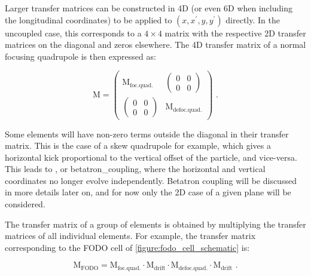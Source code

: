 Larger transfer matrices can be constructed in \num{4}D (or even \num{6}D when including the longitudinal coordinates) to be applied to \((x, x^{\prime}, y, y^{\prime})\) directly.
In the uncoupled case, this corresponds to a \(4 \times 4\) matrix with the respective \num{2}D transfer matrices on the diagonal and zeros elsewhere.
The \num{4}D transfer matrix of a \gls{normal} focusing quadrupole is then expressed as:

\begin{equation}
    \mathrm{M} = \begin{pmatrix}
        \mathrm{M_{foc. quad.}} & \begin{pmatrix}
                                    0 & 0 \\
                                    0 & 0
                                  \end{pmatrix} \\
            
        \begin{pmatrix}
            0 & 0 \\
            0 & 0
        \end{pmatrix}           & \mathrm{M_{defoc. quad.}}
        \end{pmatrix} \text{ .}
    \label{equation:4d_transfer_matrix}
\end{equation}
\vspace{0.5mm}

Some elements will have non-zero terms outside the diagonal in their transfer matrix.
This is the case of a \gls{skew} quadrupole for example, which gives a horizontal kick proportional to the vertical offset of the particle, and vice-versa.
This leads to , or \gls{betatron_coupling}, where the horizontal and vertical coordinates no longer evolve independently.
Betatron coupling will be discussed in more details later on, and for now only the \num{2}D case of a given plane will be considered.

The transfer matrix of a group of elements is obtained by multiplying the transfer matrices of all individual elements.
For example, the transfer matrix corresponding to the FODO cell of \cref{figure:fodo_cell_schematic} is:

\begin{equation}
    \mathrm{M_{FODO}} = \mathrm{M_{foc. quad.}} \cdot \mathrm{M_{drift}} \cdot \mathrm{M_{defoc. quad.}} \cdot \mathrm{M_{drift}} \text{ .}
    \label{equation:fodo_transfer_matrix}
\end{equation}

